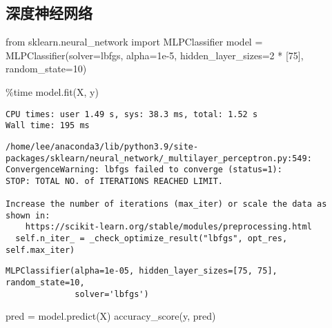\documentclass[
  letterpaper,
  DIV=11,
  numbers=noendperiod]{scrreprt}
\newenvironment{Shaded}{\begin{snugshade}}{\end{snugshade}}
\newcommand{\DecValTok}[1]{\textcolor[rgb]{0.68,0.00,0.00}{#1}}
\newcommand{\FloatTok}[1]{\textcolor[rgb]{0.68,0.00,0.00}{#1}}
\newcommand{\ImportTok}[1]{\textcolor[rgb]{0.00,0.46,0.62}{#1}}
\newcommand{\NormalTok}[1]{\textcolor[rgb]{0.00,0.23,0.31}{#1}}
\newcommand{\OperatorTok}[1]{\textcolor[rgb]{0.37,0.37,0.37}{#1}}
\newcommand{\StringTok}[1]{\textcolor[rgb]{0.13,0.47,0.30}{#1}}
\begin{document}
\hypertarget{ux6df1ux5ea6ux795eux7ecfux7f51ux7edc}{%
\subsection{深度神经网络}\label{ux6df1ux5ea6ux795eux7ecfux7f51ux7edc}}

\begin{Shaded}
\begin{Highlighting}[]
\ImportTok{from}\NormalTok{ sklearn.neural\_network }\ImportTok{import}\NormalTok{ MLPClassifier}
\NormalTok{model }\OperatorTok{=}\NormalTok{ MLPClassifier(solver}\OperatorTok{=}\StringTok{\textquotesingle{}lbfgs\textquotesingle{}}\NormalTok{, alpha}\OperatorTok{=}\FloatTok{1e{-}5}\NormalTok{,}
\NormalTok{                      hidden\_layer\_sizes}\OperatorTok{=}\DecValTok{2} \OperatorTok{*}\NormalTok{ [}\DecValTok{75}\NormalTok{], random\_state}\OperatorTok{=}\DecValTok{10}\NormalTok{)}
\end{Highlighting}
\end{Shaded}

\begin{Shaded}
\begin{Highlighting}[]
\OperatorTok{\%}\NormalTok{time model.fit(X, y) }
\end{Highlighting}
\end{Shaded}

\begin{verbatim}
CPU times: user 1.49 s, sys: 38.3 ms, total: 1.52 s
Wall time: 195 ms
\end{verbatim}

\begin{verbatim}
/home/lee/anaconda3/lib/python3.9/site-packages/sklearn/neural_network/_multilayer_perceptron.py:549: ConvergenceWarning: lbfgs failed to converge (status=1):
STOP: TOTAL NO. of ITERATIONS REACHED LIMIT.

Increase the number of iterations (max_iter) or scale the data as shown in:
    https://scikit-learn.org/stable/modules/preprocessing.html
  self.n_iter_ = _check_optimize_result("lbfgs", opt_res, self.max_iter)
\end{verbatim}

\begin{verbatim}
MLPClassifier(alpha=1e-05, hidden_layer_sizes=[75, 75], random_state=10,
              solver='lbfgs')
\end{verbatim}

\begin{Shaded}
\begin{Highlighting}[]
\NormalTok{pred }\OperatorTok{=}\NormalTok{ model.predict(X) }
\NormalTok{accuracy\_score(y, pred) }
\end{Highlighting}
\end{Shaded}
\end{document}
